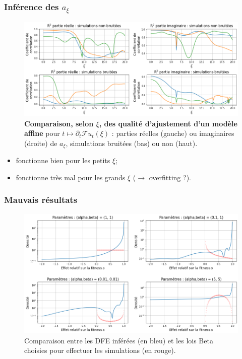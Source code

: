 \documentclass{beamer}
\newcommand{\dr}{\partial}
\newcommand{\fr}{\mathcal{F}}
\begin{document}
\begin{frame}
  \frametitle{Inférence des $a_{\xi}$}

\begin{figure}[h]
  \begin{center}
    \includegraphics[width=0.9\linewidth]{../Img/DFE_R2.png}
  \end{center}
  \caption{\label{fig:DFE_R2}\textbf{Comparaison, selon $\xi$, des qualité d'ajustement d'un modèle affine} pour $t\mapsto \dr_t\fr u_t(\xi)$ : parties réelles (gauche) ou imaginaires (droite) de $a_{\xi}$, simulations bruitées (bas) ou non (haut).}
\end{figure}

\pause

\begin{itemize}[label=$\bullet$]
\item fonctionne bien pour les petits $\xi$;
\item fonctionne très mal pour les grands $\xi$ ($\to$ overfitting ?).
\end{itemize}

\end{frame}

\begin{frame}
  \frametitle{Mauvais résultats}
  
  \begin{figure}[h]
    \begin{center}
      \includegraphics[width=0.9\linewidth]{../Img/DFE_inferred.png}
    \end{center}
    \caption{\label{fig:DFE}Comparaison entre les DFE inférées (en bleu) et les lois Beta choisies pour effectuer les simulations (en rouge).}
  \end{figure}


\end{frame}
\end{document}
